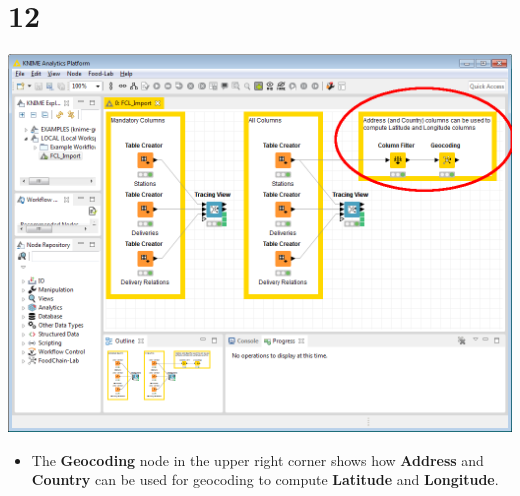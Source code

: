 \documentclass[10pt]{beamer}
\begin{document}
\section{12}
\begin{frame}
	\begin{center}
  		\includegraphics[height=0.6\textheight]{12.png}
	\end{center}
	\begin{itemize}
		\item The \textbf{Geocoding} node in the upper right corner shows how \textbf{Address} and \textbf{Country} can be used for geocoding to compute \textbf{Latitude} and \textbf{Longitude}.
	\end{itemize}
\end{frame}
\end{document}
